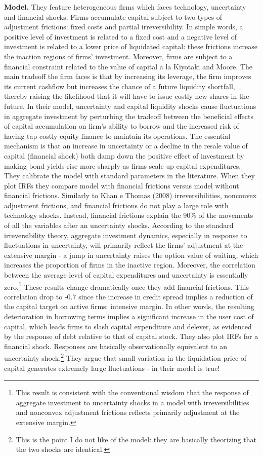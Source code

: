 \documentclass{article}
\begin{document}
{\textbf{Model.} They feature heterogeneous firms which faces technology, uncertainty and financial shocks. Firms accumulate capital subject to two types of adjustment frictions: fixed costs and partial irreversibility. In simple words, a positive level of investment is related to a fixed cost and a negative level of investment is related to a lower price of liquidated capital: these frictions increase the inaction regions of firms' investment. Moreover, firms are subject to a financial constraint related to the value of capital a la Kiyotaki and Moore. The main tradeoff the firm faces is that by increasing its leverage, the firm improves its current cashflow but increases the chance of a future liquidity shortfall, thereby raising the likelihood that it will have to issue costly new shares in the future. In their model, uncertainty and capital liquidity shocks cause fluctuations in aggregate investment by perturbing the tradeoff between the beneficial effects of capital accumulation on firm's ability to borrow and the increased risk of having tap costly equity finance to maintain its operations. The essential mechanism is that an increase in uncertainty or a decline in the resale value of capital (financial shock) both damp down the positive effect of investment by making bond yields rise more sharply as firms scale up capital expenditures. They calibrate the model with standard parameters in the literature. When they plot IRFs they compare model with financial frictions versus model without financial frictions. Similarly to Khan e Thomas (2008) irreversibilities, nonconvex adjustment frictions, and financial frictions do not play a large role with technology shocks. Instead, financial frictions explain the 90\% of the movements of all the variables after an uncertainty shocks. According to the standard irreversibility theory, aggregate investment dynamics, especially in response to fluctuations in uncertainty, will primarily reflect the firms' adjustment at the extensive margin - a jump in uncertainty raises the option value of waiting, which increases the proportion of firms in the inactive region. Moreover, the correlation between the average level of capital expenditures and uncertainty is essentially zero.\footnote{This result is consistent with the conventional wisdom that the response of aggregate investment to uncertainty shocks in a model with irreversibilities and nonconvex adjustment frictions reflects primarily adjustment at the extensive margin.} These results change dramatically once they add financial frictions. This correlation drop to -0.7 since the increase in credit spread implies a reduction of the capital target on active firms: intensive margin. In other words, the resulting deterioration in borrowing terms implies a significant increase in the user cost of capital, which leads firms to slash capital expenditure and delever, as evidenced by the response of debt relative to that of capital stock. They also plot IRFs for a financial shock. Responses are basically observationally equivalent to an uncertainty shock.\footnote{This is the point I do not like of the model: they are basically theorizing that the two shocks are identical.} They argue that small variation in the liquidation price of capital generates extremely large fluctuations - in their model is true! 

}
\end{document}
